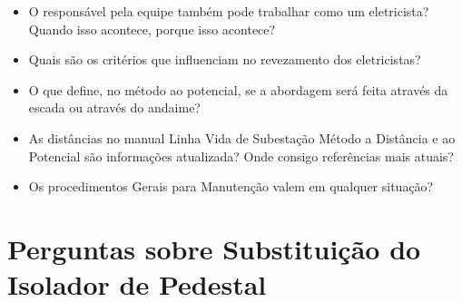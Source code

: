 \begin{itemize}
\item O responsável pela equipe também pode trabalhar como um eletricista? Quando isso acontece, porque isso acontece?
\item Quais são os critérios que influenciam no revezamento dos eletricistas? 
\item O que define, no método ao potencial, se a abordagem será feita através da escada ou através do andaime?
\item As distâncias no manual Linha Vida de Subestação Método a Distância e ao Potencial são informações atualizada? Onde consigo referências mais atuais? 
\item Os procedimentos Gerais para Manutenção valem em qualquer situação?
\end{itemize}


\section{Perguntas sobre Substituição do Isolador de Pedestal}

